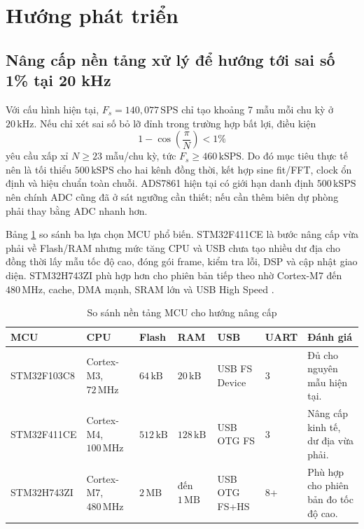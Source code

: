 \documentclass[12pt,a4paper]{report}
\newcommand{\unit}[1]{\,\mathrm{#1}}
\newcommand{\tableheadcolor}{\rowcolor{gray!18}}
\begin{document}
\section{Hướng phát triển}
\subsection{Nâng cấp nền tảng xử lý để hướng tới sai số 1\% tại 20 kHz}
Với cấu hình hiện tại, $F_s=140{,}077\unit{SPS}$ chỉ tạo khoảng 7 mẫu mỗi chu kỳ ở $20\unit{kHz}$. Nếu chỉ xét sai số bỏ lỡ đỉnh trong trường hợp bất lợi, điều kiện
\begin{equation}
1-\cos\left(\frac{\pi}{N}\right)<1\%
\end{equation}
yêu cầu xấp xỉ $N\geq23$ mẫu/chu kỳ, tức $F_s\geq460\unit{kSPS}$. Do đó mục tiêu thực tế nên là tối thiểu $500\unit{kSPS}$ cho hai kênh đồng thời, kết hợp sine fit/FFT, clock ổn định và hiệu chuẩn toàn chuỗi. ADS7861 hiện tại có giới hạn danh định $500\unit{kSPS}$ nên chính ADC cũng đã ở sát ngưỡng cần thiết; nếu cần thêm biên dự phòng phải thay bằng ADC nhanh hơn.

Bảng \ref{tab:mcu_upgrade} so sánh ba lựa chọn MCU phổ biến. STM32F411CE là bước nâng cấp vừa phải về Flash/RAM nhưng mức tăng CPU và USB chưa tạo nhiều dư địa cho đồng thời lấy mẫu tốc độ cao, đóng gói frame, kiểm tra lỗi, DSP và cập nhật giao diện. STM32H743ZI phù hợp hơn cho phiên bản tiếp theo nhờ Cortex-M7 đến $480\unit{MHz}$, cache, DMA mạnh, SRAM lớn và USB High Speed \cite{stm32f411ds,stm32h743ds}.

\begin{table}[H]
\centering
\caption{So sánh nền tảng MCU cho hướng nâng cấp}
\label{tab:mcu_upgrade}
\footnotesize
\begin{tabularx}{\textwidth}{|p{2.25cm}|p{2.7cm}|p{1.45cm}|p{1.35cm}|p{2.1cm}|p{1.35cm}|X|}
\hline
\tableheadcolor\textbf{MCU} & \textbf{CPU} & \textbf{Flash} & \textbf{RAM} & \textbf{USB} & \textbf{UART} & \textbf{Đánh giá} \\ \hline
STM32F103C8 & Cortex-M3, $72\unit{MHz}$ & $64\unit{kB}$ & $20\unit{kB}$ & USB FS Device & 3 & Đủ cho nguyên mẫu hiện tại. \\ \hline
STM32F411CE & Cortex-M4, $100\unit{MHz}$ & $512\unit{kB}$ & $128\unit{kB}$ & USB OTG FS & 3 & Nâng cấp kinh tế, dư địa vừa phải. \\ \hline
STM32H743ZI & Cortex-M7, $480\unit{MHz}$ & $2\unit{MB}$ & đến $1\unit{MB}$ & USB OTG FS+HS & 8+ & Phù hợp cho phiên bản đo tốc độ cao. \\ \hline
\end{tabularx}
\end{table}
\end{document}
